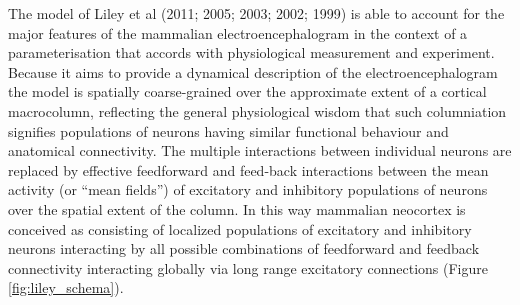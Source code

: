 \documentclass[a4paper,12pt]{article}
\begin{document}
The model of Liley et al (2011; 2005; 2003; 2002; 1999) is able to
account for the major features of the mammalian
electroencephalogram in the context of a parameterisation that
accords with physiological measurement and experiment. Because it
aims to provide a dynamical description of the electroencephalogram
the model is spatially coarse-grained over the approximate extent of a
cortical macrocolumn, reflecting the general physiological wisdom that
such columniation signifies populations of neurons having similar
functional behaviour and anatomical connectivity. The multiple
interactions between individual neurons are replaced by effective feedforward
and feed-back interactions between the mean activity (or
“mean fields”) of excitatory and inhibitory populations of neurons over
the spatial extent of the column. In this way mammalian neocortex is
conceived as consisting of localized populations of excitatory and
inhibitory neurons interacting by all possible combinations of
feedforward and feedback connectivity interacting globally via long
range excitatory connections (Figure \ref{fig:liley_schema}).
\end{document}

